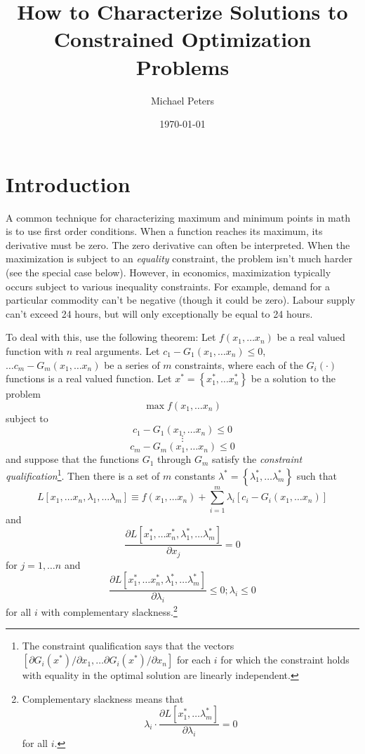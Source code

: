 \documentclass{article}
\begin{document}
\title{How to Characterize Solutions to Constrained Optimization Problems}
\author{Michael Peters}
\date{\today}
\maketitle
\section{Introduction}

A common technique for characterizing maximum and minimum points in math is to
use first order conditions. When a function reaches its maximum, its
derivative must be zero. The zero derivative can often be interpreted. When
the maximization is subject to an \emph{equality} constraint, the problem
isn't much harder (see the special case below). However, in economics,
maximization typically occurs subject to various inequality constraints. For
example, demand for a particular commodity can't be negative (though it could
be zero). Labour supply can't exceed 24 hours, but will only exceptionally be
equal to 24 hours. 

To deal with this, use the following theorem: Let $f\left(  x_{1},\dots
x_{n}\right)  $ be a real valued function with $n$ real arguments. Let
$c_{1}-G_{1}\left(  x_{1},\dots x_{n}\right)  \leq0$, $\dots c_{m}%
-G_{m}\left(  x_{1},\dots x_{n}\right)  $ be a series of $m$ constraints,
where each of the $G_{i}\left(  \cdot\right)  $ functions is a real valued
function. Let $x^{\ast}=\left\{  x_{1}^{\ast},\dots x_{n}^{\ast}\right\}  $ be
a solution to the problem%
\[
\max f\left(  x_{1},\dots x_{n}\right)
\]
subject to%
\[
c_{1}-G_{1}\left(  x_{1},\dots x_{n}\right)  \leq0
\]%
\[
\vdots
\]%
\[
c_{m}-G_{m}\left(  x_{1},\dots x_{n}\right)  \leq0
\]
and suppose that the functions $G_{1}$ through $G_{m}$ satisfy the
\emph{constraint qualification}\footnote{The constraint qualification says
that the vectors $\left[  \partial G_{i}\left(  x^{\ast}\right)  /\partial
x_{1},\dots\partial G_{i}\left(  x^{\ast}\right)  /\partial x_{n}\right]  $
for each $i$ for which the constraint holds with equality in the optimal
solution are linearly independent.}. Then there is a set of $m$ constants
$\lambda^{\ast}=\left\{  \lambda_{1}^{\ast},\dots\lambda_{m}^{\ast}\right\}  $
such that%
\[
L\left[  x_{1},\dots x_{n},\lambda_{1},\dots\lambda_{m}\right]  \equiv
f\left(  x_{1},\dots x_{n}\right)  +\sum_{i=1}^{m}\lambda_{i}[c_{i}%
-G_{i}\left(  x_{1},\dots x_{n}\right)  ]
\]
and%
\begin{equation}
\frac{\partial L\left[  x_{1}^{\ast},\dots x_{n}^{\ast},\lambda_{1}^{\ast
},\dots\lambda_{m}^{\ast}\right]  }{\partial x_{j}}=0\label{with_x}%
\end{equation}
for $j=1,\dots n$ and%
\begin{equation}
\frac{\partial L\left[  x_{1}^{\ast},\dots x_{n}^{\ast},\lambda_{1}^{\ast
},\dots\lambda_{m}^{\ast}\right]  }{\partial\lambda_{i}}\leq0;\lambda_{i}%
\leq0\label{with_lambda}%
\end{equation}
for all $i$ with complementary slackness.\footnote{Complementary slackness
means that%
\[
\lambda_{i}\cdot\frac{\partial L\left[  x_{1}^{\ast},\dots\lambda_{m}^{\ast
}\right]  }{\partial\lambda_{i}}=0
\]
for all $i$.}
\end{document}
